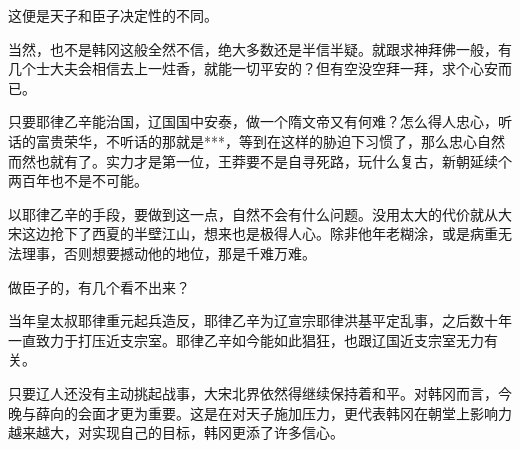 这便是天子和臣子决定性的不同。

当然，也不是韩冈这般全然不信，绝大多数还是半信半疑。就跟求神拜佛一般，有几个士大夫会相信去上一炷香，就能一切平安的？但有空没空拜一拜，求个心安而已。

只要耶律乙辛能治国，辽国国中安泰，做一个隋文帝又有何难？怎么得人忠心，听话的富贵荣华，不听话的那就是***，等到在这样的胁迫下习惯了，那么忠心自然而然也就有了。实力才是第一位，王莽要不是自寻死路，玩什么复古，新朝延续个两百年也不是不可能。

以耶律乙辛的手段，要做到这一点，自然不会有什么问题。没用太大的代价就从大宋这边抢下了西夏的半壁江山，想来也是极得人心。除非他年老糊涂，或是病重无法理事，否则想要撼动他的地位，那是千难万难。

做臣子的，有几个看不出来？

当年皇太叔耶律重元起兵造反，耶律乙辛为辽宣宗耶律洪基平定乱事，之后数十年一直致力于打压近支宗室。耶律乙辛如今能如此猖狂，也跟辽国近支宗室无力有关。

只要辽人还没有主动挑起战事，大宋北界依然得继续保持着和平。对韩冈而言，今晚与薛向的会面才更为重要。这是在对天子施加压力，更代表韩冈在朝堂上影响力越来越大，对实现自己的目标，韩冈更添了许多信心。

